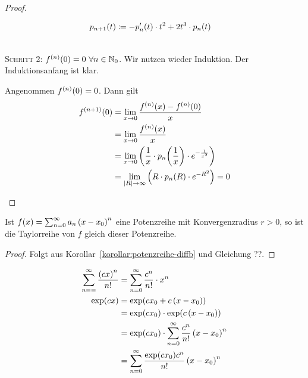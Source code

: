 \begin{beispiel}
\begin{proof}
\begin{induktionsschritt}
\begin{align*}
                p_{n+1}\of{t} &\coloneqq -p'_n\of{t}\cdot t^2 + 2t^3\cdot p_n\of{t}
            \end{align*}
        \end{induktionsschritt}~\\
        \textsc{Schritt 2}: $f^{(n)}\of{0} = 0~\forall n\in\N_0$. Wir nutzen wieder Induktion. Der Induktionsanfang ist klar.
        \begin{induktionsschritt}
            Angenommen $f^{(n)}\of{0} = 0$. Dann gilt
            \begin{align*}
                f^{(n+1)}\of{0} &= \lim_{x\fromto 0} \frac{f^{(n)}\of{x} - f^{(n)}\of{0}}{x}\\
                &= \lim_{x\fromto 0} \frac{f^{(n)}\of{x}}{x}\\
                &= \lim_{x\fromto 0}\pair{\frac{1}{x}\cdot p_n\of{\frac{1}{x}}\cdot e^{-\frac{1}{x^2}}}\\
                &= \lim_{\abs{R}\fromto \infty} \pair{R\cdot p_n\of{R}\cdot e^{-R^2}} = 0\qedhere
            \end{align*}
        \end{induktionsschritt}
    \end{proof}
\end{beispiel}

\begin{satz} %
    Ist $f\of{x} = \sum_{n=0}^{\infty} a_n\pair{x-x_0}^{n}$ eine Potenzreihe mit Konvergenzradius $r>0$, so ist die Taylorreihe von $f$ gleich dieser Potenzreihe.
    \begin{proof}
        Folgt aus Korollar~\ref{korollar:potenzreihe-diffb} und Gleichung ??.
    \end{proof}
\end{satz}

\begin{beispiel}
    \begin{align*}
        \sum_{n==}^{\infty} \frac{\pair{cx}^n}{n!} &= \sum_{n=0}^{\infty} \frac{c^n}{n!}\cdot x^n\\
        \exp\of{cx} &= \exp\of{cx_0 + c\pair{x-x_0}}\\
        &= \exp\of{cx_0}\cdot\exp\of{c\pair{x-x_0}}\\
        &= \exp\of{cx_0}\cdot \sum_{n=0}^{\infty} \frac{c^n}{n!}\pair{x-x_0}^n\\
        &= \sum_{n=0}^{\infty} \frac{\exp\of{cx_0}c^n}{n!}\pair{x-x_0}^n
    \end{align*}
\end{beispiel}

